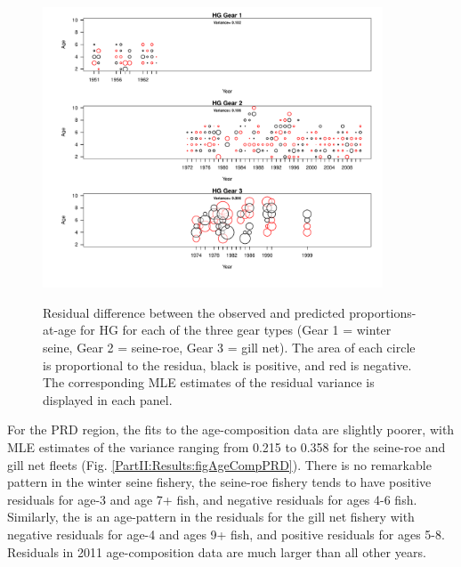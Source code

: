 \begin{figure}
	\centering
	\includegraphics[width=0.9\textwidth]{../FIGS/qPriorFigs/iscam_fig_agecompsresid_HG.pdf}\\
	\caption{Residual difference between the observed and predicted proportions-at-age for HG for each of the three gear types (Gear 1 = winter seine, Gear 2 = seine-roe, Gear 3 = gill net).  The area of each circle is proportional to the residua, black is positive, and red is negative.  The corresponding MLE estimates of the residual variance is displayed in each panel.}\label{PartII:Results:figAgeCompHG}
\end{figure}

For the PRD region, the fits to the age-composition data are slightly poorer, with MLE estimates of the variance ranging from 0.215 to 0.358 for the seine-roe and gill net fleets (Fig. \ref{PartII:Results:figAgeCompPRD}). There is no remarkable pattern in the winter seine fishery, the seine-roe fishery tends to have positive residuals for age-3 and age 7+ fish, and negative residuals for ages 4-6 fish.  Similarly, the is an age-pattern in the residuals for the gill net fishery with negative residuals for age-4 and ages 9+ fish, and positive residuals for ages 5-8.  Residuals in 2011 age-composition data are much larger  than all other years.

